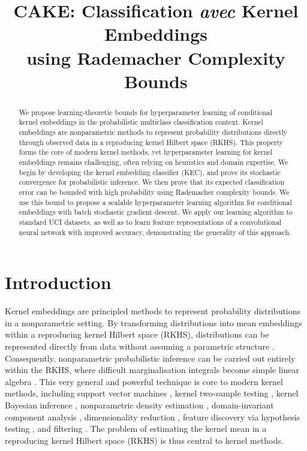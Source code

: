 \documentclass{article}
\title{CAKE: Classification \textit{avec} Kernel Embeddings \\ using Rademacher Complexity Bounds}
\author{
}
\begin{document}
\maketitle

\begin{abstract}
	We propose learning-theoretic bounds for hyperparameter learning of conditional kernel embeddings in the probabilistic multiclass classification context. Kernel embeddings are nonparametric methods to represent probability distributions directly through observed data in a reproducing kernel Hilbert space (RKHS). This property forms the core of modern kernel methods, yet hyperparameter learning for kernel embeddings remains challenging, often relying on heuristics and domain expertise. We begin by developing the kernel embedding classifier (KEC), and prove its stochastic convergence for probabilistic inference. We then prove that its expected classification error can be bounded with high probability using Rademacher complexity bounds. We use this bound to propose a scalable hyperparameter learning algorithm for conditional embeddings with batch stochastic gradient descent. We apply our learning algorithm to standard UCI datasets, as well as to learn feature representations of a convolutional neural network with improved accuracy, demonstrating the generality of this approach.
\end{abstract}

\section{Introduction}
\label{sec:introduction}
	
	Kernel embeddings are principled methods to represent probability distributions in a nonparametric setting. By transforming distributions into mean embeddings within a reproducing kernel Hilbert space (RKHS), distributions can be represented directly from data without assuming a parametric structure \citep{song2013kernel}. Consequently, nonparametric probabilistic inference can be carried out entirely within the RKHS, where difficult marginalisation integrals become simple linear algebra \citep{muandet2016kernel}. This very general and powerful technique is core to modern kernel methods, including support vector machines \citep{scholkopf2002learning}, kernel two-sample testing \citep{gretton2007kernel}, kernel Bayesian inference  \citep{fukumizu2013kernel}, nonparametric density estimation \citep{song2008tailoring, kanagawa2014recovering}, domain-invariant component analysis \citep{muandet2013domain}, dimensionality reduction \citep{fukumizu2004dimensionality}, feature discovery via hypothesis testing \citep{jitkrittum2016interpretable}, and filtering \citep{kanagawa2016filtering}. The problem of estimating the kernel mean in a reproducing kernel Hilbert space (RKHS) is thus central to kernel methods.
	
\end{document}
